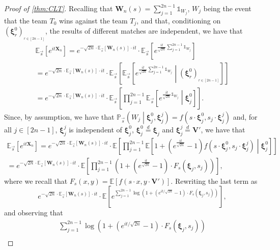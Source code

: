 \documentclass[11pt,a4paper,oneside]{article}
\theoremstyle{definition}
\theoremstyle{remark}
\def\E{\mathbb{E}}
\def\P{\mathbb{P}}
\begin{document}
\begin{proof}[Proof of \cref{thm:CLT}]
	Recalling that $\bm W_n(s)=\sum_{j=1}^{2n-1}\mathds{1}_{W_j}$, $W_{j}$ being the event that the team $T_{0}$ wins against the team $T_j$, 
	and that, conditioning on $\left( \bm \xi^{0}_r \right)_{_{r \in [2n-1]}}$, the results of different matches are independent, we have that
	\begin{multline}
	\E_{\vec{s}}\left[e^{it\bm X_n}\right]
	=e^{-\sqrt{2n} \cdot  \E_{\vec{s}}[\bm W_n(s)] \cdot it} \cdot \E_{\vec{s}} \left[e^{\frac{it}{\sqrt{2n}} \sum_{j=1}^{2n-1}\mathds{1}_{W_j}}\right]\\
	=e^{-\sqrt{2n}  \cdot  \E_{\vec{s}}[\bm W_n(s)] \cdot it}\cdot \E_{\vec{s}}\left[\E_{\vec{s}}\left[e^{\frac{it}{\sqrt{2n}}\sum_{j=1}^{2n-1}\mathds{1}_{W_j}}\middle|\left( \bm \xi^{0}_r \right)_{_{r \in [2n-1]}}  \right]\right] \\
	=e^{-\sqrt{2n} \cdot  \E_{\vec{s}}[\bm W_n(s)] \cdot it}\cdot \E_{\vec{s}}\left[ \prod_{j=1}^{2n-1} \E_{\vec{s}}\left[e^{\frac{it}{\sqrt{2n}}\mathds{1}_{W_j}}\middle| \bm \xi^{0}_j   \right]\right].
	\end{multline}
	Since, by assumption, we have that
	$
	\P_{\vec{s}}\left(W_j\middle | \bm \xi^{0}_j,\bm \xi^{j}_j\right)=f(s\cdot \bm \xi^{0}_j,s_j \cdot \bm \xi^{j}_j)
	$ 
	and, for all $j\in [2n-1]$, $\bm \xi^j_j$ is independent of $\bm \xi^{0}_j$, $\bm \xi^{0}_j\stackrel{d}{=}\bm \xi_j$ and $\bm \xi^j_j\stackrel{d}{=}\bm V'$, we have that
	\begin{multline}
	\E_{\vec{s}}\left[e^{it\bm X_n}\right] 
	= e^{-\sqrt{2n} \cdot  \E_{\vec{s}}[\bm W_n(s)] \cdot it}\cdot \E\left[ \prod_{j=1}^{2n-1} \E\left[ 1 + \left( e^{\frac{it}{\sqrt{2n}}} -1 \right) f(s\cdot \bm \xi^{0}_j,s_j \cdot \bm \xi^{j}_j) \middle| \bm \xi^{0}_j \right]\right] \\
	= e^{-\sqrt{2n} \cdot  \E_{\vec{s}}[\bm W_n(s)] \cdot it}\cdot \E\left[ \prod_{j=1}^{2n-1} \left(1 + \left( e^{\frac{it}{\sqrt{2n}}} -1 \right) \cdot F_s(\bm \xi_j,s_j) \right)\right],
	\end{multline}
	where we recall that $F_s(x,y)=\E\left[f\left(s\cdot x,y\cdot \bm V'\right)\right]$.
	Rewriting the last term as
	\begin{equation}
	e^{-\sqrt{2n}  \cdot  \E_{\vec{s}}[\bm W_n(s)] \cdot  it}\cdot \E\left[ e^{ \sum_{j=1}^{2n-1} \log  \left(1 +  (e^{it /\sqrt{2n}} -1 ) \cdot F_s(\bm \xi_j,s_j ) \right) } \right],
	\end{equation}
	and observing that
	\begin{multline}
	\sum_{j=1}^{2n-1}  \log \left(  1 + \left( e^{it /\sqrt{2n}} -1 \right) \cdot F_s\left(\bm \xi_j,s_j \right)  \right) \\

\end{multline}
\end{proof}
\end{document}
